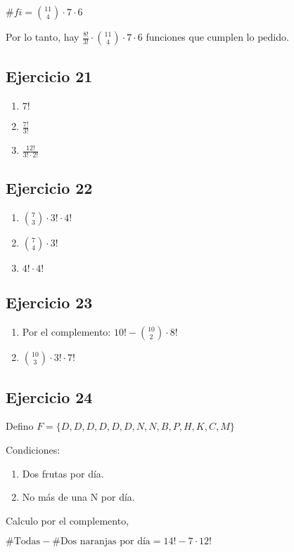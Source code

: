 $\#fi = \binom{11}{4} \cdot 7 \cdot 6$

Por lo tanto, hay $ \frac{8!}{3!} \cdot \binom{11}{4} \cdot 7 \cdot 6 $ funciones que cumplen lo pedido.

\subsection{Ejercicio 21}
\begin{enumerate}
    \item $ 7! $
    \item $ \frac{7!}{3!} $
    \item $ \frac{12!}{3!\cdot 2!} $
\end{enumerate}

\subsection{Ejercicio 22}
\begin{enumerate}
    \item $ \binom{7}{3} \cdot 3! \cdot 4! $
    \item $ \binom{7}{4} \cdot 3! $
    \item $ 4! \cdot 4! $
\end{enumerate}

\subsection{Ejercicio 23}
\begin{enumerate}
    \item Por el complemento: $ 10! - \binom{10}{2} \cdot 8!$
    \item $ \binom{10}{3} \cdot 3! \cdot 7!$
\end{enumerate}

\subsection{Ejercicio 24}
Defino $ F = \{ D,D,D,D,D,D,N,N,B,P,H,K,C,M \} $

Condiciones:
\begin{enumerate}
    \item Dos frutas por día.
    \item No más de una N por día.
\end{enumerate}

Calculo por el complemento,

$ \# \text{Todas} - \# \text{Dos naranjas por día} = 14! - 7 \cdot 12!$


